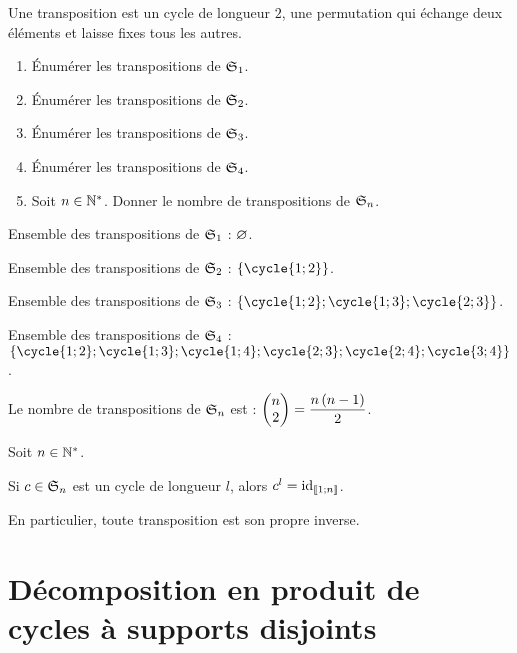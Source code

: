 \begin{defi}[Transposition]
Une transposition est un cycle de longueur \(2\), \cad une permutation qui échange deux éléments et laisse fixes tous les autres.
\end{defi}

\begin{exoex}[Transpositions]
\begin{enumerate}
    \item Énumérer les transpositions de \(\S{1}\). \\
    \item Énumérer les transpositions de \(\S{2}\). \\
    \item Énumérer les transpositions de \(\S{3}\). \\
    \item Énumérer les transpositions de \(\S{4}\). \\
    \item Soit \(n\in\Ns\). Donner le nombre de transpositions de \(\S{n}\).
\end{enumerate}
\end{exoex}

\begin{corr}
Ensemble des transpositions de \(\S{1}\) : \(\ensvide\).

Ensemble des transpositions de \(\S{2}\) : \(\accol{\cycle{1;2}}\).

Ensemble des transpositions de \(\S{3}\) : \(\accol{\cycle{1;2};\cycle{1;3};\cycle{2;3}}\).

Ensemble des transpositions de \(\S{4}\) : \(\accol{\cycle{1;2};\cycle{1;3};\cycle{1;4};\cycle{2;3};\cycle{2;4};\cycle{3;4}}\).

Le nombre de transpositions de \(\S{n}\) est : \(\binom{2}{n}=\dfrac{n\paren{n-1}}{2}\).
\end{corr}

\begin{rem}
Soit \(n\in\Ns\).

Si \(c\in\S{n}\) est un cycle de longueur \(l\), alors \(c^l=\id{\interventierii{1}{n}}\).

En particulier, toute transposition est son propre inverse.
\end{rem}

\section{Décomposition en produit de cycles à supports disjoints}

